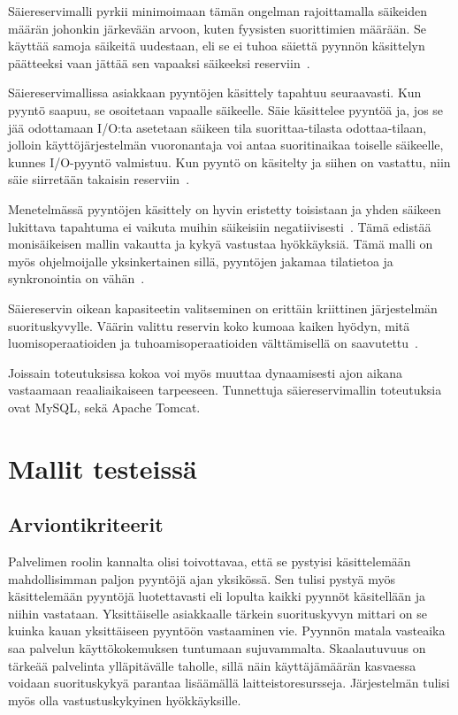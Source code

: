 \documentclass[12pt]{article}
\begin{document}
Säiereservimalli pyrkii minimoimaan tämän ongelman rajoittamalla
säikeiden määrän johonkin järkevään arvoon, kuten fyysisten suorittimien
määrään. Se käyttää samoja säikeitä uudestaan, eli se ei tuhoa säiettä
pyynnön käsittelyn päätteeksi vaan jättää sen vapaaksi säikeeksi reserviin~\cite{ling_analysis_2000}.

Säiereservimallissa asiakkaan pyyntöjen käsittely tapahtuu seuraavasti.
Kun pyyntö saapuu, se osoitetaan vapaalle säikeelle. Säie käsittelee pyyntöä ja,
jos se jää odottamaan I/O:ta asetetaan säikeen tila suorittaa-tilasta odottaa-tilaan,
jolloin käyttöjärjestelmän vuoronantaja voi antaa suoritinaikaa toiselle säikeelle,
kunnes I/O-pyyntö valmistuu. Kun pyyntö on käsitelty ja siihen on vastattu, niin
säie siirretään takaisin reserviin~\cite{ling_analysis_2000}.

Menetelmässä pyyntöjen käsittely on hyvin eristetty toisistaan ja
yhden säikeen lukittava tapahtuma ei vaikuta muihin säikeisiin negatiivisesti~\cite{davis_case_2017}.
Tämä edistää monisäikeisen mallin vakautta ja kykyä vastustaa hyökkäyksiä.
Tämä malli on myös ohjelmoijalle yksinkertainen sillä, pyyntöjen jakamaa tilatietoa
ja synkronointia on vähän~\cite{hu_applying_1998}.

Säiereservin oikean kapasiteetin valitseminen on erittäin kriittinen 
järjestelmän suorituskyvylle.
Väärin valittu reservin koko kumoaa kaiken hyödyn, mitä luomisoperaatioiden
ja tuhoamisoperaatioiden välttämisellä on saavutettu~\cite{ling_analysis_2000}.

Joissain toteutuksissa kokoa voi myös muuttaa dynaamisesti ajon aikana vastaamaan
reaaliaikaiseen tarpeeseen.
Tunnettuja säiereservimallin toteutuksia ovat MySQL, sekä Apache Tomcat.

\section{Mallit testeissä}
\subsection{Arviontikriteerit}
Palvelimen roolin kannalta olisi toivottavaa, että
se pystyisi käsittelemään mahdollisimman paljon pyyntöjä
ajan yksikössä. Sen tulisi pystyä myös käsittelemään pyyntöjä
luotettavasti eli lopulta kaikki pyynnöt käsitellään ja niihin vastataan.
Yksittäiselle asiakkaalle tärkein suorituskyvyn mittari on se kuinka kauan
yksittäiseen pyyntöön vastaaminen vie. Pyynnön matala vasteaika saa
palvelun käyttökokemuksen tuntumaan sujuvammalta.
Skaalautuvuus on tärkeää palvelinta ylläpitävälle taholle, sillä
näin käyttäjämäärän kasvaessa voidaan suorituskykyä parantaa
lisäämällä laitteistoresursseja. Järjestelmän tulisi myös
olla vastustuskykyinen hyökkäyksille.
\end{document}
